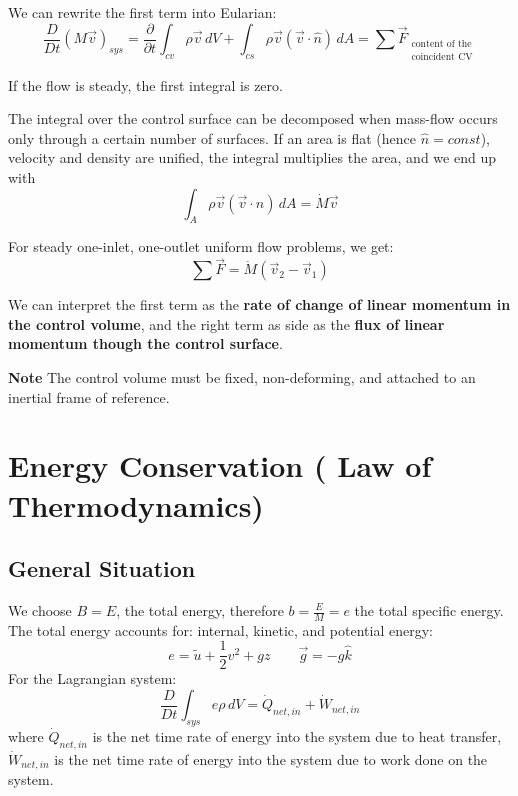 We can rewrite the first term into Eularian:
\begin{equation}
\frac{D}{Dt}(M\vec v)_{sys} =\boxed{\frac{\partial}{\partial t}\int_{cv}\rho\vec v \,dV+ \int_{cs}\rho\vec v(\vec v\cdot \hat n)\,dA=\sum \vec F_{\substack{\text{content of the}\\\text{coincident CV}}}}
\end{equation}

If the flow is steady, the first integral is zero.


The integral over the control surface can be decomposed when mass-flow occurs only through a certain number of surfaces. If an area is flat (hence $\hat n=const$), velocity and density are unified, the integral multiplies the area, and we end up with
\begin{equation*}
	\int_A \rho\vec v(\vec v\cdot \hat n)\,dA = \dot M\vec v
\end{equation*}

For steady one-inlet, one-outlet uniform flow problems, we get:
\begin{equation*}
	\sum\vec F = \dot M(\vec v_2-\vec v_1)
\end{equation*}

We can interpret the first term as the \textbf{rate of change of linear momentum in the control volume}, and the right term as side as the \textbf{flux of linear momentum though the control surface}.


\textbf{Note} The control volume must be fixed, non-deforming, and attached to an inertial frame of reference. 


\section{Energy Conservation ( Law of Thermodynamics)}

\subsection{General Situation}
We choose $B=E$, the total energy, therefore $b=\frac EM=e$ the total specific energy. The total energy accounts for: internal, kinetic, and potential  energy:
\begin{equation*}
	e=\tilde u+\frac 12 v^2+gz\qquad \vec g = -g\hat k
\end{equation*}
For the Lagrangian system:
\begin{equation*}
	\frac{D}{Dt}\int_{sys}e\rho\,dV = \dot Q_{net, in}+\dot W_{net, in}
\end{equation*}
where $\dot Q_{net,in}$ is the net time rate of energy into the system due to heat transfer, $\dot W_{net,in}$ is the net time rate of energy into the system due to work done on the system.

